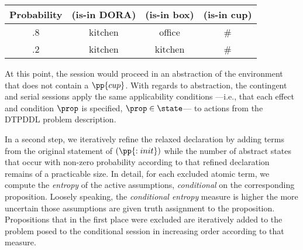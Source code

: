 \small
\begin{tabular}{cccc}
\hline
Probability & (is-in DORA)  & (is-in box)  & (is-in cup) \\
\hline
.8 & kitchen & office & \# \\
.2 & kitchen & kitchen & \# \\
\hline
\end{tabular}
\normalsize

\noindent At this point, the session would proceed in an
abstraction of the environment that does not contain a
$\pp{cup}$. With regards to abstraction, the contingent and serial
sessions apply the same applicability conditions ---i.e., that each
effect and condition $\prop$ is specified, $\prop\in\state$--- to
actions from the DTPDDL problem description.

In a second step, we iteratively refine the relaxed declaration by
adding terms from the original statement of $(\pp{:init})$ while the
number of abstract states that occur with non-zero probability
according to that refined declaration remains of a practicable
size. In detail, for each excluded atomic term, we compute the {\em
entropy} of the active assumptions, {\em conditional} on the
corresponding proposition. Loosely speaking, the {\em conditional
entropy} measure is higher the more uncertain those assumptions are
given truth assignment to the proposition. Propositions that in the
first place were excluded are iteratively added to the problem posed
to the conditional session in increasing order according to that
measure.













